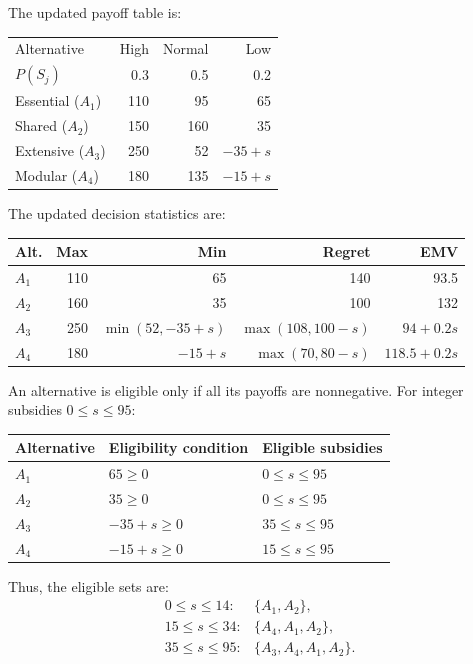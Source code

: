 The updated payoff table is:

\begin{center}\small\setlength{\tabcolsep}{4pt}
	\begin{tabular}{lrrr}\toprule
		Alternative & High & Normal & Low\\
		$P(S_j)$ & 0.3 & 0.5 & 0.2\\ \midrule
				Essential ($A_1$) & 110 & 95 & 65\\
		Shared ($A_2$) & 150 & 160 & 35\\
		Extensive ($A_3$) & 250 & 52 & $-35+s$\\
		Modular ($A_4$) & 180 & 135 & $-15+s$\\
		\bottomrule
	\end{tabular}
\end{center}

The updated decision statistics are:

\begin{center}\small\setlength{\tabcolsep}{4pt}
	\begin{tabular}{lrrrr}\toprule
		Alt. & Max & Min & Regret & EMV\\ \midrule
				$A_1$ & 110 & 65 & 140 & 93.5\\
		$A_2$ & 160 & 35 & 100 & 132\\
		$A_3$ & 250 & $\min(52,-35+s)$ & $\max(108,100-s)$ & $94+0.2s$\\
		$A_4$ & 180 & $-15+s$ & $\max(70,80-s)$ & $118.5+0.2s$\\
		\bottomrule
	\end{tabular}
\end{center}

An alternative is eligible only if all its payoffs are nonnegative.
For integer subsidies $0\le s\le95$:

\begin{center}
\begin{tabular}{lll}\toprule
Alternative & Eligibility condition & Eligible subsidies\\\midrule
$A_1$ & $65\ge0$ & $0\le s\le95$\\
$A_2$ & $35\ge0$ & $0\le s\le95$\\
$A_3$ & $-35+s\ge0$ & $35\le s\le95$\\
$A_4$ & $-15+s\ge0$ & $15\le s\le95$\\
\bottomrule
\end{tabular}
\end{center}

Thus, the eligible sets are:
\[
\begin{array}{ll}
0\le s\le14: & \{A_1,A_2\},\\
15\le s\le34: & \{A_4,A_1,A_2\},\\
35\le s\le95: & \{A_3,A_4,A_1,A_2\}.
\end{array}
\]

